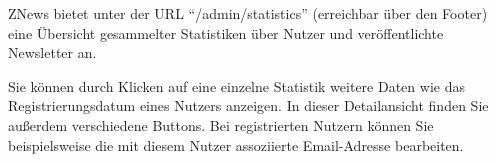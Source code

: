 ZNews bietet unter der URL ``/admin/statistics'' (erreichbar über den Footer)
eine Übersicht gesammelter Statistiken über Nutzer und veröffentlichte Newsletter an.


Sie können durch Klicken auf eine einzelne Statistik
weitere Daten wie das Registrierungsdatum eines Nutzers
anzeigen.
In dieser Detailansicht finden Sie außerdem verschiedene Buttons.
Bei registrierten Nutzern können Sie beispielsweise
die mit diesem Nutzer assoziierte Email-Adresse bearbeiten.

